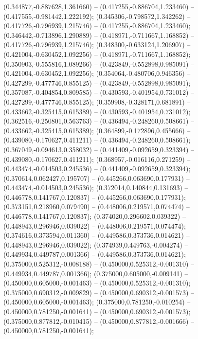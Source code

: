  (0.344877,-0.887628,1.361660) -- (0.417255,-0.886704,1.233460) -- (0.417555,-0.981442,1.222192);
 (0.345306,-0.798572,1.342262) -- (0.417726,-0.796939,1.215746) -- (0.417255,-0.886704,1.233460);
 (0.346442,-0.713896,1.290889) -- (0.418971,-0.711667,1.168852) -- (0.417726,-0.796939,1.215746);
 (0.348300,-0.633124,1.206907) -- (0.421004,-0.630452,1.092256) -- (0.418971,-0.711667,1.168852);
 (0.350903,-0.555816,1.089266) -- (0.423849,-0.552898,0.985091) -- (0.421004,-0.630452,1.092256);
 (0.354064,-0.480706,0.946356) -- (0.427299,-0.477746,0.855125) -- (0.423849,-0.552898,0.985091);
 (0.357087,-0.404854,0.809585) -- (0.430593,-0.401954,0.731012) -- (0.427299,-0.477746,0.855125);
 (0.359908,-0.328171,0.681891) -- (0.433662,-0.325415,0.615389) -- (0.430593,-0.401954,0.731012);
 (0.362516,-0.250801,0.563763) -- (0.436494,-0.248260,0.508661) -- (0.433662,-0.325415,0.615389);
 (0.364899,-0.172896,0.455666) -- (0.439080,-0.170627,0.411211) -- (0.436494,-0.248260,0.508661);
 (0.367049,-0.094613,0.358032) -- (0.441409,-0.092659,0.323394) -- (0.439080,-0.170627,0.411211);
 (0.368957,-0.016116,0.271259) -- (0.443474,-0.014503,0.245536) -- (0.441409,-0.092659,0.323394);
 (0.370614,0.062427,0.195707) -- (0.445266,0.063690,0.177931) -- (0.443474,-0.014503,0.245536);
 (0.372014,0.140844,0.131693) -- (0.446778,0.141767,0.120837) -- (0.445266,0.063690,0.177931);
 (0.373151,0.218960,0.079490) -- (0.448006,0.219571,0.074474) -- (0.446778,0.141767,0.120837);
 (0.374020,0.296602,0.039322) -- (0.448943,0.296946,0.039022) -- (0.448006,0.219571,0.074474);
 (0.374616,0.373594,0.011360) -- (0.449586,0.373736,0.014621) -- (0.448943,0.296946,0.039022);
 (0.374939,0.449763,-0.004274) -- (0.449934,0.449787,0.001366) -- (0.449586,0.373736,0.014621);
 (0.375000,0.525312,-0.008188) -- (0.450000,0.525312,-0.001310) -- (0.449934,0.449787,0.001366);
 (0.375000,0.605000,-0.009141) -- (0.450000,0.605000,-0.001463) -- (0.450000,0.525312,-0.001310);
 (0.375000,0.690312,-0.009829) -- (0.450000,0.690312,-0.001573) -- (0.450000,0.605000,-0.001463);
 (0.375000,0.781250,-0.010254) -- (0.450000,0.781250,-0.001641) -- (0.450000,0.690312,-0.001573);
 (0.375000,0.877812,-0.010415) -- (0.450000,0.877812,-0.001666) -- (0.450000,0.781250,-0.001641);
